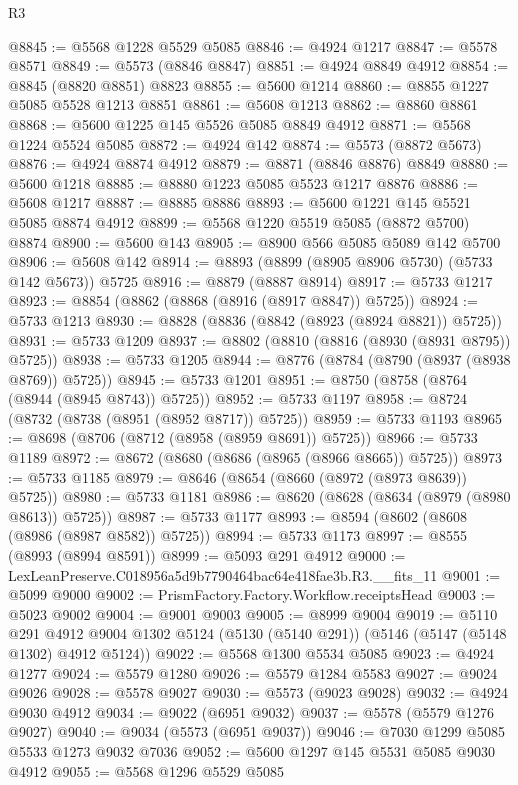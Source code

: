 \begin{lexlean}{R3}
\begin{coremodule}
@8845 := @5568 @1228 @5529 @5085
@8846 := @4924 @1217
@8847 := @5578 @8571
@8849 := @5573 (@8846 @8847)
@8851 := @4924 @8849 @4912
@8854 := @8845 (@8820 @8851) @8823
@8855 := @5600 @1214
@8860 := @8855 @1227 @5085 @5528 @1213 @8851
@8861 := @5608 @1213
@8862 := @8860 @8861
@8868 := @5600 @1225 @145 @5526 @5085 @8849 @4912
@8871 := @5568 @1224 @5524 @5085
@8872 := @4924 @142
@8874 := @5573 (@8872 @5673)
@8876 := @4924 @8874 @4912
@8879 := @8871 (@8846 @8876) @8849
@8880 := @5600 @1218
@8885 := @8880 @1223 @5085 @5523 @1217 @8876
@8886 := @5608 @1217
@8887 := @8885 @8886
@8893 := @5600 @1221 @145 @5521 @5085 @8874 @4912
@8899 := @5568 @1220 @5519 @5085 (@8872 @5700) @8874
@8900 := @5600 @143
@8905 := @8900 @566 @5085 @5089 @142 @5700
@8906 := @5608 @142
@8914 := @8893 (@8899 (@8905 @8906 @5730) (@5733 @142 @5673)) @5725
@8916 := @8879 (@8887 @8914)
@8917 := @5733 @1217
@8923 := @8854 (@8862 (@8868 (@8916 (@8917 @8847)) @5725))
@8924 := @5733 @1213
@8930 := @8828 (@8836 (@8842 (@8923 (@8924 @8821)) @5725))
@8931 := @5733 @1209
@8937 := @8802 (@8810 (@8816 (@8930 (@8931 @8795)) @5725))
@8938 := @5733 @1205
@8944 := @8776 (@8784 (@8790 (@8937 (@8938 @8769)) @5725))
@8945 := @5733 @1201
@8951 := @8750 (@8758 (@8764 (@8944 (@8945 @8743)) @5725))
@8952 := @5733 @1197
@8958 := @8724 (@8732 (@8738 (@8951 (@8952 @8717)) @5725))
@8959 := @5733 @1193
@8965 := @8698 (@8706 (@8712 (@8958 (@8959 @8691)) @5725))
@8966 := @5733 @1189
@8972 := @8672 (@8680 (@8686 (@8965 (@8966 @8665)) @5725))
@8973 := @5733 @1185
@8979 := @8646 (@8654 (@8660 (@8972 (@8973 @8639)) @5725))
@8980 := @5733 @1181
@8986 := @8620 (@8628 (@8634 (@8979 (@8980 @8613)) @5725))
@8987 := @5733 @1177
@8993 := @8594 (@8602 (@8608 (@8986 (@8987 @8582)) @5725))
@8994 := @5733 @1173
@8997 := @8555 (@8993 (@8994 @8591))
@8999 := @5093 @291 @4912
@9000 := LexLeanPreserve.C018956a5d9b7790464bac64e418fae3b.R3.__fits_11
@9001 := @5099 @9000
@9002 := PrismFactory.Factory.Workflow.receiptsHead
@9003 := @5023 @9002
@9004 := @9001 @9003
@9005 := @8999 @9004
@9019 := @5110
    @291
    @4912
    @9004
    @1302
    @5124
    (@5130 (@5140 @291))
    (@5146 (@5147 (@5148 @1302) @4912 @5124))
@9022 := @5568 @1300 @5534 @5085
@9023 := @4924 @1277
@9024 := @5579 @1280
@9026 := @5579 @1284 @5583
@9027 := @9024 @9026
@9028 := @5578 @9027
@9030 := @5573 (@9023 @9028)
@9032 := @4924 @9030 @4912
@9034 := @9022 (@6951 @9032)
@9037 := @5578 (@5579 @1276 @9027)
@9040 := @9034 (@5573 (@6951 @9037))
@9046 := @7030 @1299 @5085 @5533 @1273 @9032 @7036
@9052 := @5600 @1297 @145 @5531 @5085 @9030 @4912
@9055 := @5568 @1296 @5529 @5085

\end{coremodule}
\end{lexlean}
